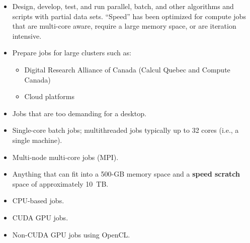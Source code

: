 
\begin{itemize}
    \item
    Design, develop, test, and run parallel, batch, and other algorithms and scripts with partial data sets.
    ``Speed'' has been optimized for compute jobs that are multi-core aware,
    require a large memory space, or are iteration intensive.
    
    \item
    Prepare jobs for large clusters such as:
        \begin{itemize}
        \item 
        Digital Research Alliance of Canada (Calcul Quebec and Compute Canada)
        \item 
        Cloud platforms
        \end{itemize}
    \item
    Jobs that are too demanding for a desktop. 
    \item
    Single-core batch jobs; multithreaded jobs typically up to 32 cores (i.e., a single machine).
    \item
    Multi-node multi-core jobs (MPI).
    \item
    Anything that can fit into a 500-GB memory space and a \textbf{speed scratch} space of approximately 10~TB. 
    \item
    CPU-based jobs. 
    \item
    CUDA GPU jobs.
    \item
    Non-CUDA GPU jobs using OpenCL.
\end{itemize}